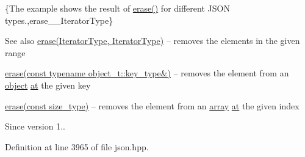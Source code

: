 \{The example shows the result of {\ttfamily \hyperlink{classnlohmann_1_1basic__json_ab9f8c9a02d6bb794ee26801a232ca4f4}{erase()}} for different J\+S\+O\+N types.,erase\+\_\+\+\_\+\+Iterator\+Type\}

\begin{DoxySeeAlso}{See also}
\hyperlink{classnlohmann_1_1basic__json_aa8996e3f8cd3e5113dcc3cb34bef7c0a}{erase(\+Iterator\+Type, Iterator\+Type)} -- removes the elements in the given range 

\hyperlink{classnlohmann_1_1basic__json_aa36e72ffc3241b960fe9186d19e03bc3}{erase(const typename object\+\_\+t\+::key\+\_\+type\&)} -- removes the element from an \hyperlink{classnlohmann_1_1basic__json_ad25b2f8c21e241e2d63455537a9294ff}{object} \hyperlink{classnlohmann_1_1basic__json_a214a8c22d616fd3567b88932c07436c9}{at} the given key 

\hyperlink{classnlohmann_1_1basic__json_a3da254c422ede5495f2815c5e48c00c5}{erase(const size\+\_\+type)} -- removes the element from an \hyperlink{classnlohmann_1_1basic__json_a5685815624b086caa532f41e853d4b0f}{array} \hyperlink{classnlohmann_1_1basic__json_a214a8c22d616fd3567b88932c07436c9}{at} the given index
\end{DoxySeeAlso}
\begin{DoxySince}{Since}
version 1.. 
\end{DoxySince}


Definition at line 3965 of file json.\+hpp.

\hypertarget{classnlohmann_1_1basic__json_aa8996e3f8cd3e5113dcc3cb34bef7c0a}{}
